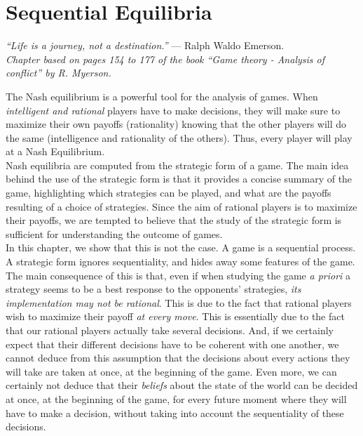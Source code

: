 \ifx \globalmark \undefined %

\else
\fi



\chapter{Sequential Equilibria} \label{chap:Seq}

{\large{\itshape
``Life is a journey, not a destination.''} --- Ralph Waldo Emerson.\\
}
  {\small{\itshape
Chapter based on pages 154 to 177 of the book  ``Game theory - Analysis of conflict'' by R. Myerson.}\\
}

The Nash equilibrium is a powerful tool for the analysis of games. When \emph{intelligent and rational} players have to make decisions, they will make sure to maximize their own payoffs (rationality) knowing that the other players will do the same (intelligence and rationality of the others).
Thus, every player will play at a Nash Equilibrium.\\
Nash equilibria are computed from the strategic form of a game. The main idea behind the use of the strategic form is that it provides a concise summary of the game, highlighting which strategies can be played, and what are the payoffs resulting of a choice of strategies.  Since the aim of rational players is to  maximize their payoffs, we are tempted to believe that the study of the strategic form is sufficient for understanding the outcome of games.\\
In this chapter, we show that this is not the case. A game is a sequential process. A strategic form ignores sequentiality, and hides away some features of the game. The main consequence of this is that, even if when studying the game \emph{a priori} a strategy seems to be a best response to the opponents' strategies, \emph{its implementation may not be rational}. This is due to the fact that rational players wish to maximize their payoff \emph{at every move}. This is essentially due to the fact that our rational players actually take several decisions.  And, if we certainly expect that their different decisions have to be coherent with one another, we cannot deduce from this assumption that the decisions about every actions they will take are taken at once, at the beginning of the game. Even more, we can certainly not deduce that their \emph{beliefs} about the state of the world can be decided at once, at the beginning of the game, for every future moment where they will have to make a decision, without taking into account the sequentiality of these decisions.\\
